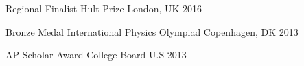 



\begin{cvhonors}
  \cvhonor
    {Regional Finalist} %
    {Hult Prize} %
    {London, UK} %
    {2016} %
    
  \cvhonor
    {Bronze Medal} %
    {International Physics Olympiad} %
    {Copenhagen, DK} %
    {2013} %

  \cvhonor
    {AP Scholar Award} %
    {College Board} %
    {U.S} %
    {2013} %

\end{cvhonors}




